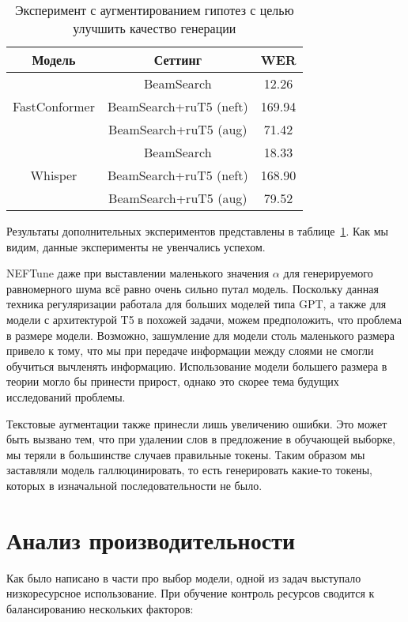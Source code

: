 \begin{table}[]
\centering
\caption{Эксперимент с аугментированием гипотез с целью улучшить качество генерации}
\begin{tabular}{|c|c|c|}
\hline
Модель                         & Сеттинг                              & WER     \\ \hline
\multirow{3}{*}{FastConformer} & BeamSearch                           & 12.26   \\ \cline{2-3} 
                               & BeamSearch+ruT5 (neft)               & 169.94  \\ \cline{2-3} 
                               & BeamSearch+ruT5 (aug)                & 71.42   \\ \hline
\multirow{3}{*}{Whisper}       & BeamSearch                           & 18.33   \\ \cline{2-3} 
                               & BeamSearch+ruT5 (neft)               & 168.90  \\ \cline{2-3} 
                               & BeamSearch+ruT5 (aug)                & 79.52   \\ \hline
\end{tabular}
\label{tab:fails}
\end{table}

Результаты дополнительных экспериментов представлены в таблице~\ref{tab:fails}.
Как мы видим, данные эксперименты не увенчались успехом.

NEFTune даже при выставлении маленького значения $\alpha$ для генерируемого равномерного шума всё равно очень сильно путал модель.
Поскольку данная техника регуляризации работала для больших моделей типа GPT\cite{jain2023neftune}, а также для модели с архитектурой T5 в похожей задачи\cite{iudinenhancing}, можем предположить, что проблема в размере модели.
Возможно, зашумление для модели столь маленького размера привело к тому, что мы при передаче информации между слоями не смогли обучиться вычленять информацию.
Использование модели большего размера в теории могло бы принести прирост, однако это скорее тема будущих исследований проблемы.

Текстовые аугментации также принесли лишь увеличению ошибки.
Это может быть вызвано тем, что при удалении слов в предложение в обучающей выборке, мы теряли в большинстве случаев правильные токены.
Таким образом мы заставляли модель галлюцинировать, то есть генерировать какие-то токены, которых в изначальной последовательности не было.

\section{Анализ производительности}
Как было написано в части про выбор модели, одной из задач выступало низкоресурсное использование.
При обучение контроль ресурсов сводится к балансированию нескольких факторов:

